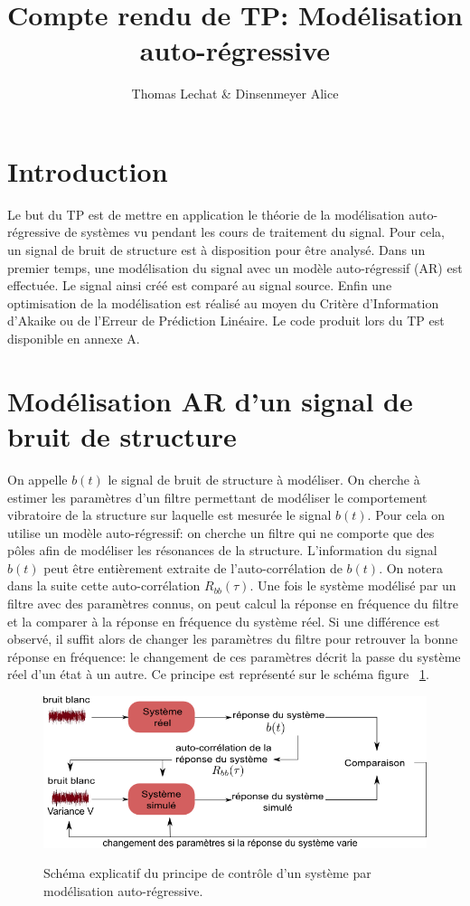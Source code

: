 \documentclass[a4paper]{article}
\title{Compte rendu de TP: Modélisation auto-régressive }
\author{Thomas Lechat \& Dinsenmeyer Alice}
\begin{document}
\maketitle



\section{Introduction}
Le but du TP est de mettre en application le théorie de la modélisation auto-régressive de systèmes vu pendant les cours de traitement du signal. Pour cela, un signal de bruit de structure est à disposition pour être analysé. Dans un premier temps, une modélisation du signal avec un modèle auto-régressif (AR) est effectuée. Le signal ainsi créé est comparé au signal source. Enfin une optimisation de la modélisation est réalisé au moyen du Critère d'Information d'Akaike ou de l'Erreur de Prédiction Linéaire.
Le code produit lors du TP est disponible en annexe A.


\section{Modélisation AR d'un signal de bruit de structure}
On appelle $b(t)$ le signal de bruit de structure à modéliser. On cherche à estimer les paramètres d'un filtre permettant de modéliser le comportement vibratoire de la structure sur laquelle est mesurée le signal $b(t)$. Pour cela on utilise un modèle auto-régressif: on cherche un filtre qui ne comporte que des pôles afin de modéliser les résonances de la structure. L'information du signal $b(t)$ peut être entièrement extraite de l'auto-corrélation de $b(t)$. On notera dans la suite cette auto-corrélation $R_{bb}(\tau)$. 
\bigskip
Une fois le système modélisé par un filtre avec des paramètres connus, on peut calcul la réponse en fréquence du filtre et la comparer à la réponse en fréquence du système réel. Si une différence est observé, il suffit alors de changer les paramètres du filtre pour retrouver la bonne réponse en fréquence: le changement de ces paramètres décrit la passe du système réel d'un état à un autre. Ce principe est représenté sur le schéma figure ~\ref{schema1}.

\begin{figure}[!h]
	\centering
	\includegraphics[scale=0.7]{schema_explicatif.png}
    \label{schema1}
    \caption{Schéma explicatif du principe de contrôle d'un système par modélisation auto-régressive.}
\end{figure}
\end{document}
